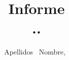 \documentclass{IEEEtran}
\title{Informe\\..}
\author{
    Apellidos ~Nombre,~\IEEEmembership{Código:~000000,}
}
\begin{document}
\maketitle

\IEEEpeerreviewmaketitle
\IEEEtitleabstractindextext
\IEEEpeerreviewmaketitle









\end{document}
